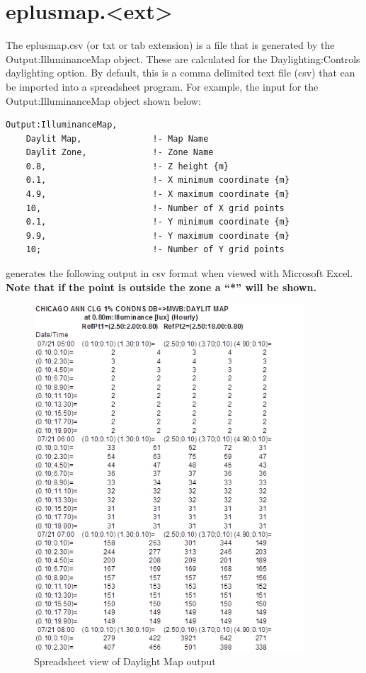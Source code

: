 \section{eplusmap.\textless{}ext\textgreater{}}\label{eplusmap.ext}

The eplusmap.csv (or txt or tab extension) is a file that is generated by the Output:IlluminanceMap object. These are calculated for the Daylighting:Controls daylighting option. By default, this is a comma delimited text file (csv) that can be imported into a spreadsheet program. For example, the input for the Output:IlluminanceMap object shown below:

\begin{lstlisting}
Output:IlluminanceMap,
    Daylit Map,              !- Map Name
    Daylit Zone,             !- Zone Name
    0.8,                     !- Z height {m}
    0.1,                     !- X minimum coordinate {m}
    4.9,                     !- X maximum coordinate {m}
    10,                      !- Number of X grid points
    0.1,                     !- Y minimum coordinate {m}
    9.9,                     !- Y maximum coordinate {m}
    10;                      !- Number of Y grid points
\end{lstlisting}

generates the following output in csv format when viewed with Microsoft Excel.~ \textbf{Note that if the point is outside the zone a ``*'' will be shown.}

\begin{figure}[hbtp] %
\centering
\includegraphics[width=0.9\textwidth, height=0.9\textheight, keepaspectratio=true]{media/image019.png}
\caption{Spreadsheet view of Daylight Map output \protect \label{fig:spreadsheet-view-of-daylight-map-output}}
\end{figure}

